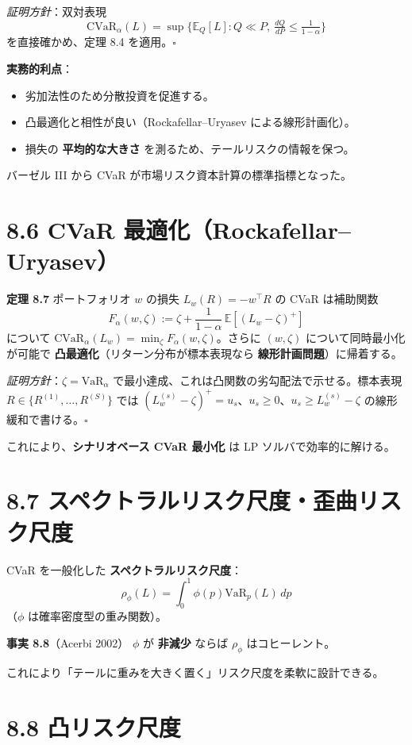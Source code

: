 \documentclass[11pt,a4paper]{report}
\begin{document}
\emph{証明方針}：双対表現 \[ \mathrm{CVaR}_\alpha(L) = \sup\bigl\{ \mathbb{E}_Q[L] : Q \ll P,\ \tfrac{dQ}{dP} \le \tfrac{1}{1-\alpha}\bigr\} \] を直接確かめ、定理 8.4 を適用。$\square$

\textbf{実務的利点}：
\begin{itemize}
\item 劣加法性のため分散投資を促進する。
\item 凸最適化と相性が良い（Rockafellar–Uryasev による線形計画化）。
\item 損失の \textbf{平均的な大きさ} を測るため、テールリスクの情報を保つ。
\end{itemize}

バーゼル III から CVaR が市場リスク資本計算の標準指標となった。

\section{8.6 CVaR 最適化（Rockafellar–Uryasev）}

\textbf{定理 8.7} ポートフォリオ $w$ の損失 $L_w(R) = -w^\top R$ の CVaR は補助関数 \[ F_\alpha(w, \zeta) := \zeta + \frac{1}{1-\alpha}\, \mathbb{E}[(L_w - \zeta)^+] \] について $\mathrm{CVaR}_\alpha(L_w) = \min_\zeta F_\alpha(w, \zeta)$。さらに $(w, \zeta)$ について同時最小化が可能で \textbf{凸最適化}（リターン分布が標本表現なら \textbf{線形計画問題}）に帰着する。

\emph{証明方針}：$\zeta = \mathrm{VaR}_\alpha$ で最小達成、これは凸関数の劣勾配法で示せる。標本表現 $R \in \{R^{(1)}, \dots, R^{(S)}\}$ では $(L_w^{(s)} - \zeta)^+ = u_s$、$u_s \ge 0$、$u_s \ge L_w^{(s)} - \zeta$ の線形緩和で書ける。$\square$

これにより、\textbf{シナリオベース CVaR 最小化} は LP ソルバで効率的に解ける。

\section{8.7 スペクトラルリスク尺度・歪曲リスク尺度}

CVaR を一般化した \textbf{スペクトラルリスク尺度}： \[ \rho_\phi(L) = \int_0^1 \phi(p) \mathrm{VaR}_p(L) \, dp \] （$\phi$ は確率密度型の重み関数）。

\textbf{事実 8.8}（Acerbi 2002） $\phi$ が \textbf{非減少} ならば $\rho_\phi$ はコヒーレント。

これにより「テールに重みを大きく置く」リスク尺度を柔軟に設計できる。

\section{8.8 凸リスク尺度}
\end{document}
